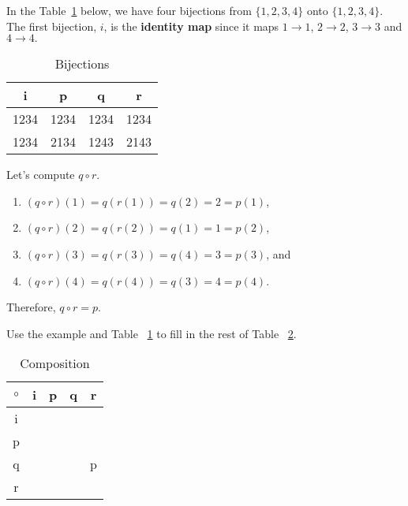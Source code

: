 In the Table~\ref{bijection} below, we have four bijections from $\{1,2,3,4\}$ onto $\{1,2,3,4\}$. The first bijection, $i$, is the \textbf{identity map} since it maps $1 \to 1$, $2 \to 2$, $3 \to 3$ and $4 \to 4.$
\begin{table}[H]
   \begin{center}
     \begin{tabular}{|| c | c | c | c ||}
     \hline
     i\qquad  & p\qquad & q\qquad & r\qquad \\ \hline\hline
     1234     &1234     &1234     &1234     \\ \hline
     1234     &2134     &1243     &2143     \\ \hline
    \end{tabular}
   \end{center}
   \caption{Bijections}
    \label{bijection}
  \end{table}
Let's compute $q \circ r$.
\begin{enumerate}
\item $(q\circ r)(1)=q(r(1))=q(2)=2=p(1)$,
\item $(q\circ r)(2)=q(r(2))=q(1)=1=p(2)$,
\item $(q\circ r)(3)=q(r(3))=q(4)=3=p(3)$, and
\item $(q\circ r)(4)=q(r(4))=q(3)=4=p(4)$.
\end{enumerate}

Therefore,  $q \circ r = p$.

\begin{prb}
Use the example and Table ~\ref{bijection} to fill in the rest of Table ~\ref{composition}.
\end{prb}

\begin{table}[H]
 \begin{center}
  \begin{tabular}{|| c || c | c | c | c ||}
  \hline
  $\circ$&\quad i\quad&\quad p\quad&\quad q\quad&\quad r\quad\\
  \hline\hline
  i\quad &            &            &            &      \\ \hline
  p\quad &            &            &            &      \\ \hline
  q\quad &            &            &            &\quad p\quad\\ \hline
  r\quad &            &            &            &      \\ \hline
  \end{tabular}
 \end{center}
 \caption{Composition}
 \label{composition}
\end{table}

